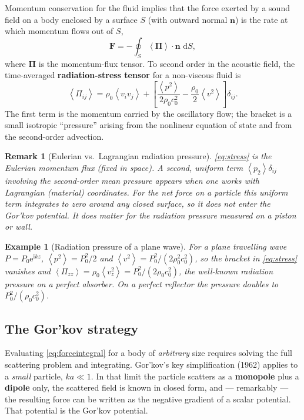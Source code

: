 \documentclass[11pt]{article}
\newtheorem{remark}{Remark}[section]
\newtheorem{example}{Example}[section]
\newcommand{\rrho}{\rho_{0}}
\newcommand{\cc}{c_{0}}
\newcommand{\avg}[1]{\left\langle #1 \right\rangle}
\newcommand{\vpSq}{\avg{p^{2}}}
\newcommand{\vvSq}{\avg{v^{2}}}
\newcommand{\dd}{\,\mathrm{d}}
\newcommand{\ee}{\mathrm{e}}
\newcommand{\ii}{\mathrm{i}}
\newcommand{\nn}{\mathbf{n}}
\begin{document}
Momentum conservation for the fluid implies that the force exerted by a sound
field on a body enclosed by a surface $S$ (with outward normal $\nn$) is the
rate at which momentum flows out of $S$,
\begin{equation}
  \mathbf{F}=-\oint_{S} \avg{\boldsymbol{\Pi}}\cdot\nn\,\dd S,
  \label{eq:forceintegral}
\end{equation}
where $\boldsymbol{\Pi}$ is the momentum-flux tensor. To second order in the
acoustic field, the time-averaged \textbf{radiation-stress tensor} for a
non-viscous fluid is
\begin{equation}
  \avg{\Pi_{ij}}=\rrho\avg{v_{i}v_{j}}
    +\left[\frac{\vpSq}{2\rrho\cc^{2}}-\frac{\rrho}{2}\vvSq\right]\delta_{ij}.
  \label{eq:stress}
\end{equation}
The first term is the momentum carried by the oscillatory flow; the bracket is a
small isotropic ``pressure'' arising from the nonlinear equation of state and
from the second-order advection.

\begin{remark}[Eulerian vs.\ Lagrangian radiation pressure]
\eqref{eq:stress} is the \emph{Eulerian} momentum flux (fixed in space). A
second, uniform term $\avg{p_{2}}\delta_{ij}$ involving the second-order mean
pressure appears when one works with \emph{Lagrangian} (material) coordinates.
For the \emph{net force on a particle} this uniform term integrates to zero
around any closed surface, so it does not enter the Gor'kov potential. It
\emph{does} matter for the radiation pressure measured on a piston or wall.
\end{remark}

\begin{example}[Radiation pressure of a plane wave]
For a plane travelling wave $P=P_{0}\ee^{\ii kz}$, $\vpSq=P_{0}^{2}/2$ and
$\vvSq=P_{0}^{2}/(2\rrho^{2}\cc^{2})$, so the bracket in \eqref{eq:stress}
vanishes and $\avg{\Pi_{zz}}=\rrho\avg{v_{z}^{2}}=P_{0}^{2}/(2\rrho\cc^{2})$,
the well-known radiation pressure on a perfect absorber. On a perfect reflector
the pressure doubles to $P_{0}^{2}/(\rrho\cc^{2})$.
\end{example}

\subsection{The Gor'kov strategy}

Evaluating \eqref{eq:forceintegral} for a body of \emph{arbitrary} size requires
solving the full scattering problem and integrating. Gor'kov's key simplification
(1962) applies to a \emph{small} particle, $ka\ll1$. In that limit the particle
scatters as a \textbf{monopole} plus a \textbf{dipole} only, the scattered field
is known in closed form, and --- remarkably --- the resulting force can be written
as the negative gradient of a scalar potential. That potential is the Gor'kov
potential.
\end{document}
